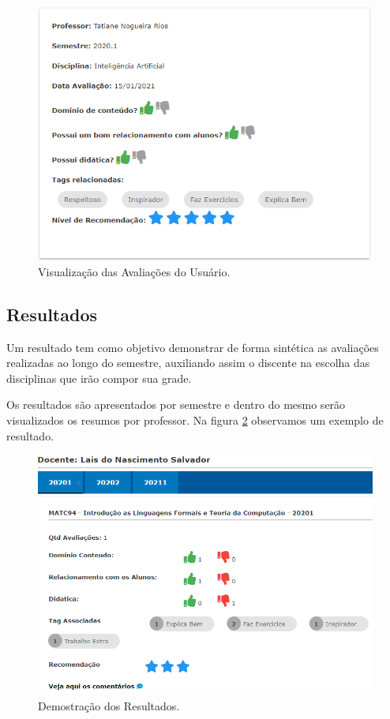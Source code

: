 \documentclass[12pt, a4paper]{report}
\begin{document}
\begin{itemize}
\begin{figure}
\centering
\includegraphics[scale=0.7]{visualizacao_minha_avaliacao.png}
\caption{Visualização das Avaliações do Usuário.}
\label{fig:visualizacao_minha_avaliacao}
\end{figure}

\end{itemize}
\subsection{Resultados}
Um resultado tem como objetivo demonstrar de forma sintética as avaliações realizadas ao longo do semestre, auxiliando assim o discente na escolha das disciplinas que irão compor sua  grade.

Os resultados são apresentados por semestre e dentro do mesmo serão visualizados os resumos por professor. Na figura \ref{fig:resultados} observamos um exemplo de resultado.

\begin{figure}
\centering
\includegraphics[scale=0.7]{resultados.png}
\caption{Demostração dos Resultados.}
\label{fig:resultados}
\end{figure}
\end{document}
